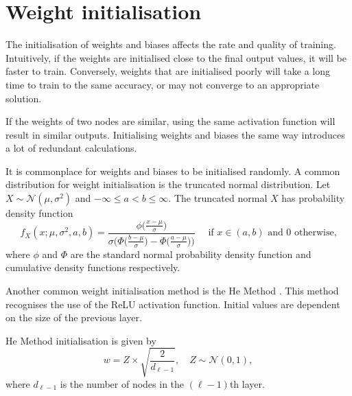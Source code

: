 \section{Weight initialisation}

The initialisation of weights and biases affects the rate and quality of training. Intuitively, if the weights are initialised close to the final output values, it will be faster to train. Conversely, weights that are initialised poorly will take a long time to train to the same accuracy, or may not converge to an appropriate solution.

If the weights of two nodes are similar, using the same activation function will result in similar outputs. Initialising weights and biases the same way introduces a lot of redundant calculations. 

It is commonplace for weights and biases to be initialised randomly. A common distribution for weight initialisation is the truncated normal distribution. Let $X\sim\mathcal{N}(\mu,\sigma^2)$ and $-\infty \le a < b \le \infty$. The truncated normal $X$ has probability density function
\[
	f_X(x;\mu, \sigma^2,a,b) = \dfrac{\phi\big(\frac{x-\mu}{\sigma}\big)}{\sigma\bigg(\Phi\big(\frac{b-\mu}{\sigma}\big) - \Phi\big(\frac{a-\mu}{\sigma}\big)\bigg)}\quad \text{ if } x \in (a,b) \text{ and 0 otherwise,}
\]
where $\phi$ and $\Phi$ are the standard normal probability density function and cumulative density functions respectively.

Another common weight initialisation method is the He Method \cite{HeKaiming2015DDiR}. This method recognises the use of the ReLU activation function. Initial values are dependent on the size of the previous layer.

He Method initialisation is given by
\[
	w = Z\times\sqrt{\dfrac{2}{d_{\ell-1}}},\quad Z\sim\mathcal{N}(0,1),
\]
where $d_{\ell-1}$ is the number of nodes in the $(\ell-1)$th layer.



